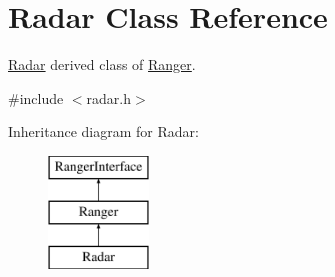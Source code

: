 \hypertarget{classRadar}{}\section{Radar Class Reference}
\label{classRadar}


\hyperlink{classRadar}{Radar} derived class of \hyperlink{classRanger}{Ranger}.  




{\ttfamily \#include $<$radar.\+h$>$}

Inheritance diagram for Radar\+:\begin{figure}[H]
\begin{center}
\leavevmode
\includegraphics[height=3.000000cm]{classRadar}
\end{center}
\end{figure}
